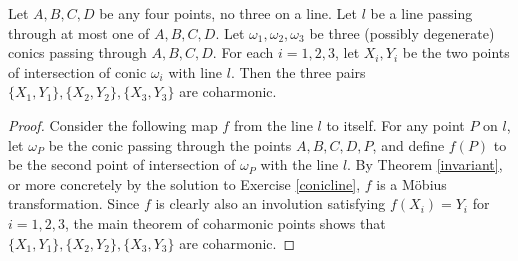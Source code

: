\begin{thm} Let $A,B,C,D$ be any four points, no three on a line. Let $l$ be a line passing through at most one of $A,B,C,D$. Let $\omega_1,\omega_2,\omega_3$ be three (possibly degenerate) conics passing through $A,B,C,D$. For each $i=1,2,3$, let $X_i, Y_i$ be the two points of intersection of conic $\omega_i$ with line $l$. Then the three pairs $\{X_1, Y_1\}, \{X_2,Y_2\}, \{X_3,Y_3\}$ are coharmonic.
\end{thm}
\begin{proof} Consider the following map $f$ from the line $l$ to itself. For any point $P$ on $l$, let $\omega_P$ be the conic passing through the points $A,B,C,D,P$, and define $f(P)$ to be the second point of intersection of $\omega_P$ with the line $l$. By Theorem \ref{invariant}, or more concretely by the solution to Exercise \ref{conicline}, $f$ is a M\"obius transformation. Since $f$ is clearly also an involution satisfying $f(X_i) = Y_i$ for $i=1,2,3$, the main theorem of coharmonic points shows that $\{X_1, Y_1\}, \{X_2,Y_2\}, \{X_3,Y_3\}$ are coharmonic.
\end{proof}

